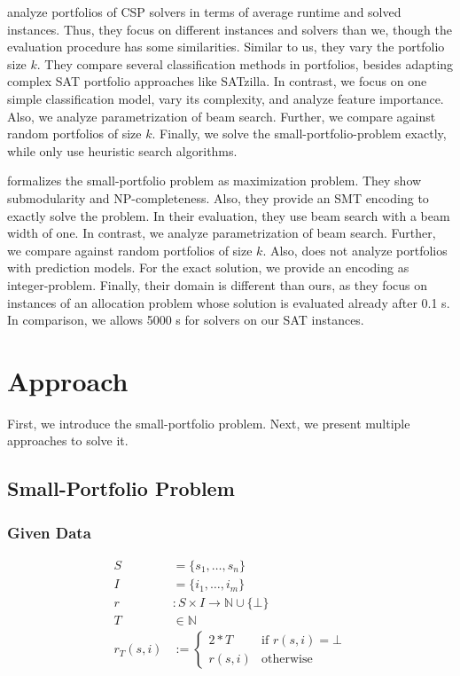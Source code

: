 \documentclass[conference]{IEEEtran}
\begin{document}
\cite{amadini2014empirical, amadini2016extensive} analyze portfolios of CSP solvers in terms of average runtime and solved instances.
Thus, they focus on different instances and solvers than we, though the evaluation procedure has some similarities.
Similar to us, they vary the portfolio size $k$.
They compare several classification methods in portfolios, besides adapting complex SAT portfolio approaches like SATzilla.
In contrast, we focus on one simple classification model, vary its complexity, and analyze feature importance.
Also, we analyze parametrization of beam search.
Further, we compare against random portfolios of size $k$.
Finally, we solve the small-portfolio-problem exactly, while \cite{amadini2014empirical} only use heuristic search algorithms.

\cite{nof2020real} formalizes the small-portfolio problem as maximization problem.
They show submodularity and NP-completeness.
Also, they provide an SMT encoding to exactly solve the problem.
In their evaluation, they use beam search with a beam width of one.
In contrast, we analyze parametrization of beam search.
Further, we compare against random portfolios of size $k$.
Also, \cite{nof2020real} does not analyze portfolios with prediction models.
For the exact solution, we provide an encoding as integer-problem.
Finally, their domain is different than ours, as they focus on instances of an allocation problem whose solution is evaluated already after 0.1 s.
In comparison, we allows 5000 s for solvers on our SAT instances.

\section{Approach}
\label{sec:approach}

First, we introduce the small-portfolio problem.
Next, we present multiple approaches to solve it.

\subsection{Small-Portfolio Problem}

\subsubsection{Given Data}
\label{sec:approach:problem:data}

\begin{align*}
	S &= \{s_1, \dots, s_n\} \tag*{Solvers}\\
	I &= \{i_1, \dots, i_m\} \tag*{Instances}\\
	r &: S \times I \rightarrow \mathbb{N} \cup \{\bot\} \tag*{Runtimes (censored)}\\
	T &\in \mathbb{N} \tag*{Timeout}\\
	r_T(s,i) &:= \begin{cases}
		2*T & \text{if }r(s,i) = \bot\\
		r(s,i) & \text{otherwise}
	\end{cases} \tag*{Penalized Runtimes}
\end{align*}
\end{document}
